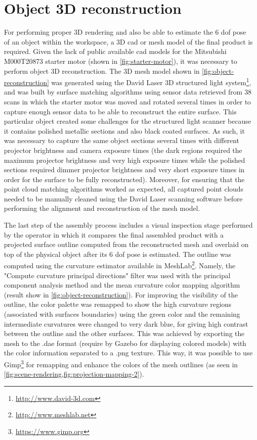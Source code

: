 \section{Object 3D reconstruction}\label{sec:object-reconstruction}

For performing proper 3D rendering and also be able to estimate the 6 \gls{dof} pose of an object within the workspace, a 3D \gls{cad} or mesh model of the final product is required. Given the lack of public available \gls{cad} models for the Mitsubishi M000T20873 starter motor (shown in \cref{fig:starter-motor}), it was necessary to perform object 3D reconstruction. The 3D mesh model shown in \cref{fig:object-reconstruction} was generated using the David Laser 3D structured light system\footnote{\url{http://www.david-3d.com}}, and was built by surface matching algorithms using sensor data retrieved from 38 scans in which the starter motor was moved and rotated several times in order to capture enough sensor data to be able to reconstruct the entire surface. This particular object created some challenges for the structured light scanner because it contains polished metallic sections and also black coated surfaces. As such, it was necessary to capture the same object sections several times with different projector brightness and camera exposure times (the dark regions required the maximum projector brightness and very high exposure times while the polished sections required dimmer projector brightness and very short exposure times in order for the surface to be fully reconstructed). Moreover, for ensuring that the point cloud matching algorithms worked as expected, all captured point clouds needed to be manually cleaned using the David Laser scanning software before performing the alignment and reconstruction of the mesh model.

The last step of the assembly process includes a visual inspection stage performed by the operator in which it compares the final assembled product with a projected surface outline computed from the reconstructed mesh and overlaid on top of the physical object after its 6 \gls{dof} pose is estimated. The outline was computed using the curvature estimator available in MeshLab\footnote{\url{http://www.meshlab.net}}. Namely, the "Compute curvature principal directions" filter was used with the principal component analysis method and the mean curvature color mapping algorithm (result show in \cref{fig:object-reconstruction}). For improving the visibility of the outline, the color palette was remapped to show the high curvature regions (associated with surfaces boundaries) using the green color and the remaining intermediate curvatures were changed to very dark blue, for giving high contrast between the outline and the other surfaces. This was achieved by exporting the mesh to the .dae format (require by Gazebo for displaying colored models) with the color information separated to a .png texture. This way, it was possible to use Gimp\footnote{\url{https://www.gimp.org}} for remapping and enhance the colors of the mesh outlines (as seen in \cref{fig:scene-rendering,fig:projection-mapping-2}).

